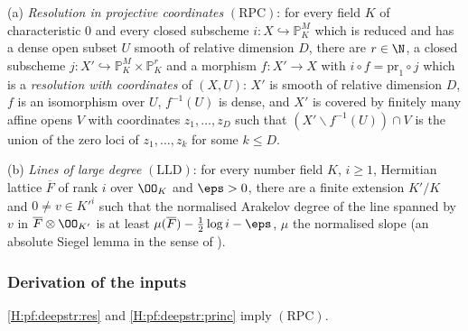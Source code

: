 \begin{definition}\label{def:pf:deepstr:resk}
(a) \emph{Resolution in projective coordinates} $\mathrm{(RPC)}$: for every field $K$ of characteristic $0$ and
every closed subscheme $i\colon X\hookrightarrow\mathbb P^M_K$ which is reduced and has a dense open subset $U$ smooth of
relative dimension $D$, there are $r\in\N$, a closed subscheme $j\colon X'\hookrightarrow\mathbb P^M_K\times\mathbb P^r_K$ and a
morphism $f\colon X'\to X$ with $i\circ f=\mathrm{pr}_1\circ j$ which is a \emph{resolution with coordinates} of
$(X,U)$: $X'$ is smooth of relative dimension $D$, $f$ is an isomorphism over $U$, $f^{-1}(U)$ is dense, and
$X'$ is covered by finitely many affine opens $V$ with coordinates $z_1,\dots,z_D$ such that
$(X'\smallsetminus f^{-1}(U))\cap V$ is the union of the zero loci of $z_1,\dots,z_k$ for some $k\le D$.

(b) \emph{Lines of large degree} $\mathrm{(LLD)}$: for every number field $K$, $i\ge1$, Hermitian lattice
$\overline F$ of rank $i$ over $\OO_K$ and $\eps>0$, there are a finite extension $K'/K$ and $0\ne v\in K'^i$ such
that the normalised Arakelov degree of the line spanned by $v$ in $\overline F\otimes\OO_{K'}$ is at least
$\mu(\overline F)-\frac12\log i-\eps$, $\mu$ the normalised slope (an absolute Siegel lemma in the sense of
\cite{Zhang1995,RoyThunder1996}).
\end{definition}

\subsubsection*{Derivation of the inputs}

\begin{lemma}\label{lem:pf:deepstr:resk}
\ref{H:pf:deepstr:res} and \ref{H:pf:deepstr:princ} imply $\mathrm{(RPC)}$.
\end{lemma}

